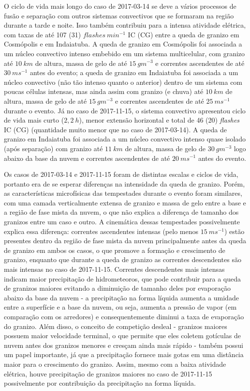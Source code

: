 O ciclo de vida mais longo do caso de 2017-03-14 se deve a vários processos de fusão e separação com outros sistemas convectivos que se formaram na região durante a tarde e noite. Isso também contribuiu para a intensa atividade elétrica, com taxas de até 107 (31) $flashes\:min^{-1}$ IC (CG) entre a queda de granizo em Cosmópolis e em Indaiatuba. A queda de granizo em Cosmópolis foi associada a um núcleo convectivo intenso embebido em um sistema multicelular, com granizo até $10\:km$ de altura, massa de gelo de até $15\:gm^{-3}$ e correntes ascendentes de até $30\:ms^{-1}$ antes do evento; a queda de granizo em Indaiatuba foi associada a um núcleo convectivo (não tão intenso quanto o anterior) dentro de um sistema com poucas células intensas, mas ainda assim com granizo (e chuva) até $10\:km$ de altura, massa de gelo de até $15\:gm^{-3}$ e correntes ascendentes de até $25\:ms^{-1}$ durante o evento. Já no caso de 2017-11-15, o sistema convectivo apresentou ciclo de vida mais curto ($2,2\:h$), menor extensão horizontal e total de 46 (20) \textit{flashes} IC (CG) (quantidade muito menor que no caso de 2017-03-14). A queda de granizo em Indaiatuba foi associada a um núcleo convectivo intenso quase isolado (após separação) com granizo até $11\:km$ de altura, massa de gelo de $30\:gm^{-3}$ logo abaixo da base da nuvem e correntes ascendentes de até $20\:ms^{-1}$ antes do evento.

Os casos de 2017-03-14 e 2017-11-15 foram de distintas escalas e ciclos de vida, portanto era de se esperar diferenças na intensidade da queda de granizo. Porém, as características microfísicas das tempestades durante o evento foram similares, com uma camada verticalmente extensa de granizo e massa de gelo entre a base e a região de fase mista da nuvem, o que não explica a diferença de tamanho dos granizos entre um caso e outro. A cinemática dessas tempestades possivelmente explica essa diferença: correntes ascendentes intensas (pelo menos $15\:ms^{-1}$) estão presentes dentro da região de fase mista da nuvem principalmente antes da queda de granizo em ambos os casos, o que promove a formação e crescimento de granizo, enquanto que durante a queda de granizo as correntes descendentes são mais intensas no caso de 2017-11-15. Correntes descendentes mais intensas indicam maior precipitação de hidrometeoros, que pode contribuir para a queda de granizos maiores evitando a diminuição de tamanho deles por evaporação abaixo da base da nuvem - a precipitação na forma líquida aumenta a umidade entre a superfície e a base da nuvem, ou seja, aumenta a pressão de vapor (em comparação com os arredores) e consequentemente diminui a taxa de evaporação do granizo. Além disso, o conceito de competição desleal - granizos maiores possuem maior velocidade terminal, o que permite que eles coletem gotículas de nuvem antes dos granizos menores e cresçam ainda mais rápido \cite{Knight2001} - também possui um papel importante, já que a precipitação fornece mais gotas em uma distância maior para o crescimento do granizo. Assim, mesmo com a baixa atividade elétrica, houve precipitação de granizos maiores no caso de 2017-11-15 possivelmente por contribuição da precipitação na forma líquida.

